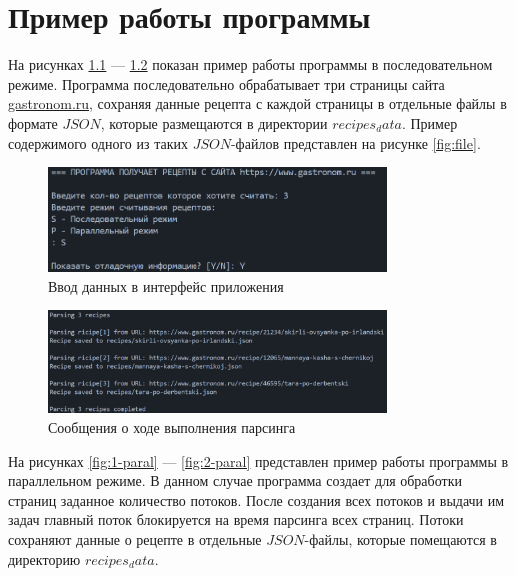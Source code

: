 \chapter{Пример работы программы}

На рисунках \ref{fig:1-seq} — \ref{fig:2-seq} показан пример работы программы в последовательном режиме. Программа последовательно обрабатывает три страницы сайта \url{gastronom.ru}, сохраняя данные рецепта с каждой страницы в отдельные файлы в формате $JSON$, которые размещаются в директории $recipes_data$. Пример содержимого одного из таких $JSON$-файлов представлен на рисунке \ref{fig:file}.

\begin{figure}[h]
	\centering
	\includegraphics[width=0.8\textwidth]{images/examples/sin.png}
	\caption{Ввод данных в интерфейс приложения}
	\label{fig:1-seq}
\end{figure}
\begin{figure}[h]
	\centering
	\includegraphics[width=0.8\textwidth]{images/examples/sout.png}
	\caption{Сообщения о ходе выполнения парсинга}
	\label{fig:2-seq}
\end{figure}


На рисунках \ref{fig:1-paral} --- \ref{fig:2-paral} представлен пример работы программы в параллельном режиме. В данном случае программа создает для обработки страниц заданное  количество потоков. После создания всех потоков и выдачи им задач главный поток блокируется на время парсинга всех страниц. Потоки сохраняют данные о рецепте в отдельные $JSON$-файлы, которые помещаются в директорию $recipes_data$.


